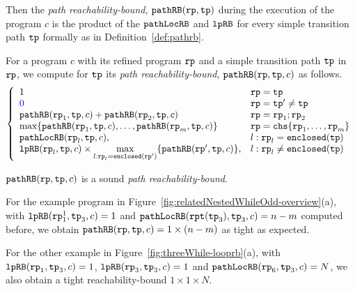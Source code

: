 Then the \emph{path reachability-bound}, $\mathtt{pathRB}(\mathtt{rp}, \mathtt{tp})$ during the execution of the program $c$ is the product of the $\mathtt{pathLocRB}$ and $\mathtt{lpRB}$ for every simple transition path $\mathtt{tp}$ formally as in Definition~\ref{def:pathrb}.
%
\begin{defn}
 \label{def:pathrb}
 For a program $c$ with its refined program $\mathtt{rp}$ and a simple transition path $\mathtt{tp}$ in $\mathtt{rp}$, 
 we compute for $\mathtt{tp}$ its \emph{path reachability-bound}, $\mathtt{pathRB}(\mathtt{rp}, \mathtt{tp}, c)$
 as follows. 
{\small 
\[
 \left\{ 
 \begin{array}{ll}
 1 & \rprog = \tpath\\
 \highlight{0} & \rprog = \tpath' \neq \tpath\\
 \inoutB(\rprog_1, \tpath, c) + \inoutB(\rprog_2, \tpath, c) & \rprog = \rprog_1;\rprog_2 \\
 \max\left\{ \inoutB(\rprog_1, \tpath, c), \ldots, \inoutB(\rprog_m, \tpath, c) \right\} 
 & \rprog = \rpchoose{\rprog_1, \ldots, \rprog_m } \\
 \outinB(\rprog_l, \tpath, c), & l: \rprog_l = \kw{enclosed}(\tpath) \\
 \lpchB(\rprog_l, \tpath , c)
 \times \max\limits_{l:\rprog_l = \kw{enclosed}(\rprog')}
 \{\inoutB(\rprog', \tpath, c)\} , & l: \rprog_l \neq \kw{enclosed}(\tpath) \\
 \end{array}
 \right.
 \]
 }
 \end{defn}

$\mathtt{pathRB}(\mathtt{rp}, \mathtt{tp}, c)$ is a sound \emph{path reachability-bound}.
%

For the example program in Figure~\ref{fig:relatedNestedWhileOdd-overview}(a),
with $\mathtt{lpRB}(\mathtt{rp}_1^1, \mathtt{tp}_3, c) = 1$ and
$\mathtt{pathLocRB}(\mathtt{rpt}(\mathtt{tp}_3), \mathtt{tp}_3, c) = n - m$ computed before,
we obtain $\mathtt{pathRB}(\mathtt{rp}, \mathtt{tp}, c) = 1 \times (n - m)$ as tight as expected.

For the other example in Figure~\ref{fig:threeWhile-looprb}(a), with $\mathtt{lpRB}(\mathtt{rp}_1, \mathtt{tp}_3, c) = 1$,
$\mathtt{lpRB}(\mathtt{rp}_3, \mathtt{tp}_3, c) = 1$ and
$\mathtt{pathLocRB}(\mathtt{rp}_6, \mathtt{tp}_3, c) = N$,
we also obtain a tight reachability-bound $1 \times 1 \times N$.

